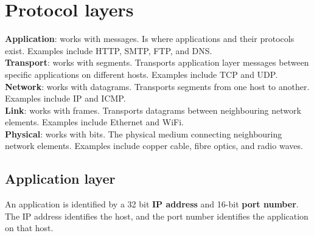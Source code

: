 \section{Protocol layers}
\textbf{Application}: works with messages. Is where applications and their protocols exist. Examples include HTTP, SMTP, FTP, and DNS.\\
\textbf{Transport}: works with segments. Transports application layer messages between specific applications on different hosts. Examples include TCP and UDP.\\
\textbf{Network}: works with datagrams. Transports segments from one host to another. Examples include IP and ICMP.\\
\textbf{Link}: works with frames. Transports datagrams between neighbouring network elements. Examples include Ethernet and WiFi.\\
\textbf{Physical}: works with bits. The physical medium connecting neighbouring network elements. Examples include copper cable, fibre optics, and radio waves.

\subsection{Application layer}
An application is identified by a 32 bit \textbf{IP address} and 16-bit \textbf{port number}. The IP address identifies the host, and the port number identifies the application on that host.

